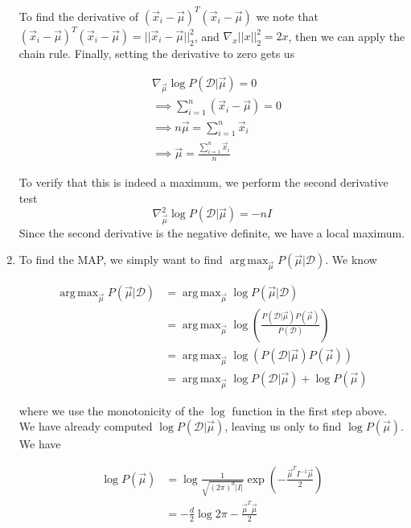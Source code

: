 \documentclass[11pt]{article}
\DeclareMathOperator*{\argmax}{arg\,max}
\begin{document}
\begin{enumerate}
		    To find the derivative of $(\vec{x}_i - \vec{\mu})^T(\vec{x}_i - \vec{\mu})$ we note that $(\vec{x}_i - \vec{\mu})^T(\vec{x}_i - \vec{\mu}) = ||\vec{x}_i - \vec{\mu}||^2_2$, and 
		    $\nabla_x ||x||^2_2 = 2x$, then we can apply the chain rule. Finally, setting the derivative to zero gets us 
		    
		    \begin{align*}
		        &\nabla_{\vec{\mu}} \log P(\mathcal{D} | \vec{\mu}) = 0 \\
		        &\implies \sum_{i=1}^n (\vec{x}_i - \vec{\mu})  = 0 \\
		        &\implies n \vec{\mu} = \sum_{i=1}^n \vec{x}_i \\ 
		        &\implies \boxed{\vec{\mu} = \frac{\sum_{i=1}^n \vec{x}_i}{n}}
		    \end{align*}
		    
		    To verify that this is indeed a maximum, we perform the second derivative test
		    \[\nabla_{\vec{\mu}}^2 \log P(\mathcal{D} | \vec{\mu}) = -nI \]
		    Since the second derivative is the negative definite, we have a local maximum.
		\item To find the MAP, we simply want to find $\argmax_{\vec{\mu}} P(\vec{\mu} | \mathcal{D})$. We know 
		
		\begin{align*}
		    \argmax_{\vec{\mu}} P(\vec{\mu} | \mathcal{D}) &= \argmax_{\vec{\mu}} \log P(\vec{\mu} | \mathcal{D}) \\ 
		    &= \argmax_{\vec{\mu}}  \log \left ( \frac{P(\mathcal{D} | \vec{\mu}) P(\vec{\mu})}{P(\mathcal{D})} \right ) \\
		    &= \argmax_{\vec{\mu}} \log ( P(\mathcal{D} | \vec{\mu}) P(\vec{\mu}) ) \\ 
		    &= \argmax_{\vec{\mu}} \log P(\mathcal{D} | \vec{\mu}) + \log P(\vec{\mu})
		\end{align*}
		
		where we use the monotonicity of the $\log$ function in the first step above. We have already computed $\log P(\mathcal{D} | \vec{\mu})$, leaving
		us only to find $\log P(\vec{\mu})$. We have 
		
		\begin{align*}
		    \log P(\vec{\mu}) &= \log \frac{1}{\sqrt{\left (2 \pi \right )^d |I|}} \exp \left(- \frac{\vec{\mu}^TI^{-1}\vec{\mu}}{2}\right) \\
		    &= -\frac{d}{2} \log 2 \pi - \frac{\vec{\mu}^T\vec{\mu}}{2}
		\end{align*}
		

\end{enumerate}
\end{document}
